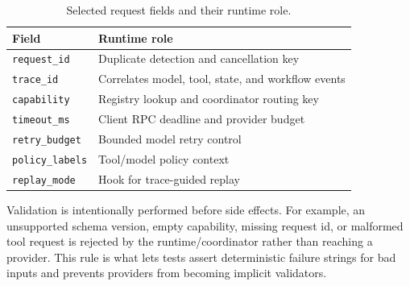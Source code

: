 \documentclass[manuscript,screen,review]{acmart}
\begin{document}
\begin{table}[t]
\caption{Selected request fields and their runtime role.}
\label{tab:request-fields}
\centering
\begin{tabular}{ll}
\toprule
Field & Runtime role \\
\midrule
\texttt{request\_id} & Duplicate detection and cancellation key \\
\texttt{trace\_id} & Correlates model, tool, state, and workflow events \\
\texttt{capability} & Registry lookup and coordinator routing key \\
\texttt{timeout\_ms} & Client RPC deadline and provider budget \\
\texttt{retry\_budget} & Bounded model retry control \\
\texttt{policy\_labels} & Tool/model policy context \\
\texttt{replay\_mode} & Hook for trace-guided replay \\
\bottomrule
\end{tabular}
\end{table}

Validation is intentionally performed before side effects. For example, an
unsupported schema version, empty capability, missing request id, or malformed
tool request is rejected by the runtime/coordinator rather than reaching a
provider. This rule is what lets tests assert deterministic failure strings for
bad inputs and prevents providers from becoming implicit validators.
\end{document}
